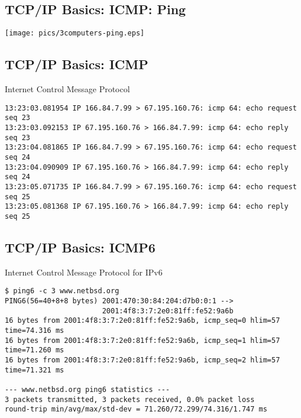 \documentclass[xga]{xdvislides}
\begin{document}
\subsection{TCP/IP Basics: ICMP: Ping}
\vspace*{\fill}
\begin{center}
	\texttt{[image: pics/3computers-ping.eps]}
\end{center}
\vspace*{\fill}


\subsection{TCP/IP Basics: ICMP}
\begin{center}
Internet Control Message Protocol
\end{center}
\vspace{.2in}

\begin{verbatim}
13:23:03.081954 IP 166.84.7.99 > 67.195.160.76: icmp 64: echo request seq 23
13:23:03.092153 IP 67.195.160.76 > 166.84.7.99: icmp 64: echo reply seq 23
13:23:04.081865 IP 166.84.7.99 > 67.195.160.76: icmp 64: echo request seq 24
13:23:04.090909 IP 67.195.160.76 > 166.84.7.99: icmp 64: echo reply seq 24
13:23:05.071735 IP 166.84.7.99 > 67.195.160.76: icmp 64: echo request seq 25
13:23:05.081368 IP 67.195.160.76 > 166.84.7.99: icmp 64: echo reply seq 25
\end{verbatim}


\subsection{TCP/IP Basics: ICMP6}
\begin{center}
Internet Control Message Protocol for IPv6
\end{center}
\vspace{.2in}

\begin{verbatim}
$ ping6 -c 3 www.netbsd.org
PING6(56=40+8+8 bytes) 2001:470:30:84:204:d7b0:0:1 -->
                       2001:4f8:3:7:2e0:81ff:fe52:9a6b
16 bytes from 2001:4f8:3:7:2e0:81ff:fe52:9a6b, icmp_seq=0 hlim=57 time=74.316 ms
16 bytes from 2001:4f8:3:7:2e0:81ff:fe52:9a6b, icmp_seq=1 hlim=57 time=71.260 ms
16 bytes from 2001:4f8:3:7:2e0:81ff:fe52:9a6b, icmp_seq=2 hlim=57 time=71.321 ms

--- www.netbsd.org ping6 statistics ---
3 packets transmitted, 3 packets received, 0.0% packet loss
round-trip min/avg/max/std-dev = 71.260/72.299/74.316/1.747 ms
\end{verbatim}
\end{document}
